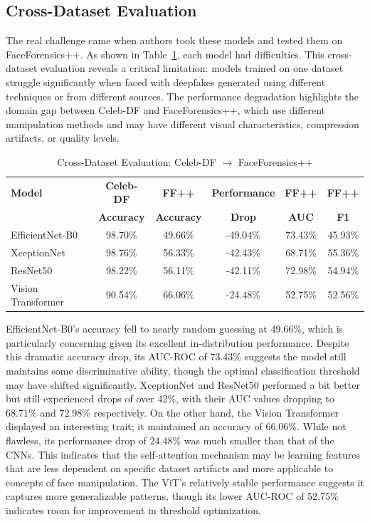 \documentclass[runningheads]{llncs}
\begin{document}
\subsection{Cross-Dataset Evaluation}
The real challenge came when authors took these models and tested them on FaceForensics++. As shown in Table~\ref{tab:cross_dataset}, each model had difficulties. This cross-dataset evaluation reveals a critical limitation: models trained on one dataset struggle significantly when faced with deepfakes generated using different techniques or from different sources. The performance degradation highlights the domain gap between Celeb-DF and FaceForensics++, which use different manipulation methods and may have different visual characteristics, compression artifacts, or quality levels.

\begin{table}[H]
\caption{Cross-Dataset Evaluation: Celeb-DF $\rightarrow$ FaceForensics++}
\label{tab:cross_dataset}
\centering
\small
\setlength{\tabcolsep}{5pt}
\begin{tabular}{lccccc}
\toprule
\textbf{Model} & \textbf{Celeb-DF} & \textbf{FF++} & \textbf{Performance} & \textbf{FF++} & \textbf{FF++} \\
 & \textbf{Accuracy} & \textbf{Accuracy} & \textbf{Drop} & \textbf{AUC} & \textbf{F1} \\
\midrule
EfficientNet-B0 & 98.70\% & 49.66\% & -49.04\% & 73.43\% & 45.93\% \\
XceptionNet & 98.76\% & 56.33\% & -42.43\% & 68.71\% & 55.36\% \\
ResNet50 & 98.22\% & 56.11\% & -42.11\% & 72.98\% & 54.94\% \\
Vision Transformer & 90.54\% & 66.06\% & -24.48\% & 52.75\% & 52.56\% \\
\bottomrule
\end{tabular}
\end{table}

EfficientNet-B0's accuracy fell to nearly random guessing at 49.66\%, which is particularly concerning given its excellent in-distribution performance. Despite this dramatic accuracy drop, its AUC-ROC of 73.43\% suggests the model still maintains some discriminative ability, though the optimal classification threshold may have shifted significantly. XceptionNet and ResNet50 performed a bit better but still experienced drops of over 42\%, with their AUC values dropping to 68.71\% and 72.98\% respectively. On the other hand, the Vision Transformer displayed an interesting trait; it maintained an accuracy of 66.06\%. While not flawless, its performance drop of 24.48\% was much smaller than that of the CNNs. This indicates that the self-attention mechanism may be learning features that are less dependent on specific dataset artifacts and more applicable to concepts of face manipulation. The ViT's relatively stable performance suggests it captures more generalizable patterns, though its lower AUC-ROC of 52.75\% indicates room for improvement in threshold optimization.
\end{document}
